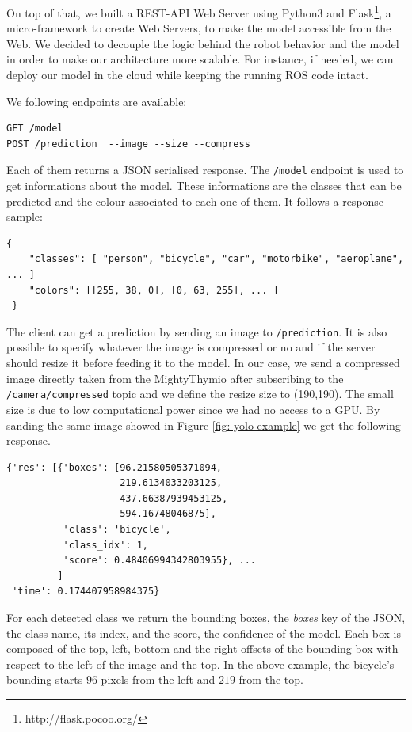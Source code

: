 \documentclass[letterpaper, 10 pt, conference]{ieeeconf}  %
\begin{document}
On top of that, we built a REST-API Web Server using Python3 and Flask\footnote{http://flask.pocoo.org/}, a micro-framework to create Web Servers, to make the model accessible from the Web. We decided to decouple the logic behind the robot behavior and the model in order to make our architecture more scalable. For instance, if needed, we can deploy our model in the cloud while keeping the running ROS code intact. 

We following endpoints are available:
\begin{lstlisting}
GET /model
POST /prediction  --image --size --compress
\end{lstlisting}
Each of them returns a JSON serialised response. The \texttt{/model} endpoint is used to get informations about the model. These informations are the classes that can be predicted and the colour associated to each one of them. It follows a response sample:
\begin{lstlisting}
{
    "classes": [ "person", "bicycle", "car", "motorbike", "aeroplane", ... ]
    "colors": [[255, 38, 0], [0, 63, 255], ... ]   
 }
\end{lstlisting}
The client can get a prediction by sending an image to \texttt{/prediction}. It is also possible to specify whatever the image is compressed or no and if the server should resize it before feeding it to the model. In our case, we send a compressed image directly taken from the MightyThymio after subscribing to the \texttt{/camera/compressed} topic and we define the resize size to (190,190). The small size is due to low computational power since we had no access to a GPU. By sanding the same image showed in Figure \ref{fig: yolo-example} we get the following response.
\begin{lstlisting}
{'res': [{'boxes': [96.21580505371094,
                    219.6134033203125,
                    437.66387939453125,
                    594.16748046875],
          'class': 'bicycle',
          'class_idx': 1,
          'score': 0.48406994342803955}, ...
         ]
 'time': 0.174407958984375}
\end{lstlisting}
For each detected class we return the bounding boxes, the \emph{boxes} key of the JSON, the class name, its index, and the score, the confidence of the model. Each box is composed of the top, left, bottom and the right offsets of the bounding box with respect to the left of the image and the top. In the above example, the bicycle's bounding starts $96$ pixels from the left and $219$ from the top.
\end{document}
